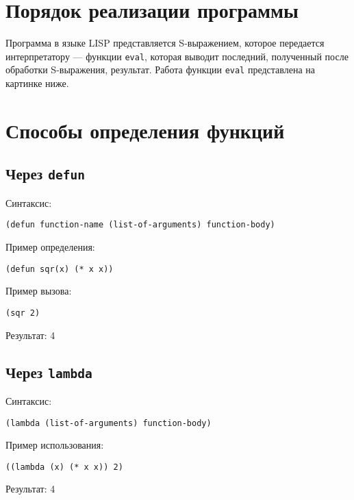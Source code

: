 \section{Порядок реализации программы}

Программа в языке LISP представляется S-выражением, которое передается интерпретатору --- функции \texttt{eval}, которая выводит последний, полученный после обработки S-выражения, результат.
Работа функции \texttt{eval} представлена на картинке ниже.


\section{Способы определения функций}

\subsection{Через \texttt{defun}}

Синтаксис:
\begin{lstlisting}
(defun function-name (list-of-arguments) function-body)
\end{lstlisting}

Пример определения:
\begin{lstlisting}
(defun sqr(x) (* x x))
\end{lstlisting}

Пример вызова:
\begin{lstlisting}
(sqr 2)
\end{lstlisting}
Результат: 4

\subsection{Через \texttt{lambda}}

Синтаксис:
\begin{lstlisting}
(lambda (list-of-arguments) function-body)
\end{lstlisting}

Пример использования:
\begin{lstlisting}
((lambda (x) (* x x)) 2)
\end{lstlisting}
Результат: 4
